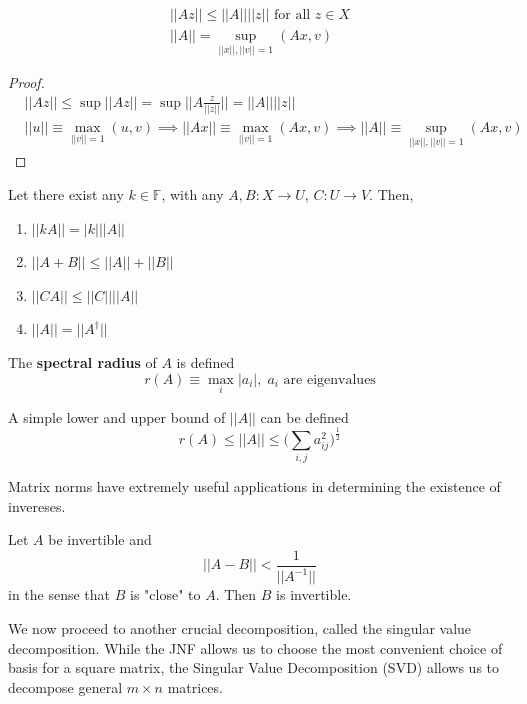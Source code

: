   \begin{theorem}
  \begin{align}
      ||A z|| \leq ||A|| ||z|| \text{ for all } z \in X \\
      ||A|| = \sup_{||x||, ||v|| = 1} (A x, v)
  \end{align}
  \end{theorem}
  \begin{proof}
  \begin{align*}
      &||A z|| \leq \sup{||A z||} = \sup{\Big|\Big| A \frac{z}{||z||} \Big|\Big|} = ||A|| ||z|| \\
      &||u|| \equiv \max_{||v||=1} (u, v) \implies ||A x|| \equiv \max_{||v||=1} (Ax, v) \implies ||A|| \equiv \sup_{||x||, ||v|| =1} (A x, v)
  \end{align*}
  \end{proof}

  \begin{theorem}
  Let there exist any $k \in \mathbb{F}$, with any $A, B: X \longrightarrow U$, $C: U \longrightarrow V$. Then, 
  \begin{enumerate}
      \item $||k A|| = |k| ||A||$
      \item $||A + B|| \leq ||A|| + ||B||$
      \item $||C A|| \leq ||C|| ||A||$
      \item $||A|| = ||A^\dagger||$
  \end{enumerate}
  \end{theorem}

  \begin{definition}
  The \textbf{spectral radius} of $A$ is defined
  \[r(A) \equiv \max_i |a_i|, \; a_i \text{ are eigenvalues}\]
  \end{definition}

  \begin{proposition}
  A simple lower and upper bound of $||A||$ can be defined
  \[ r(A) \leq ||A|| \leq \bigg( \sum_{i, j} a_{i j}^2 \bigg)^\frac{1}{2}\]
  \end{proposition}

  Matrix norms have extremely useful applications in determining the existence of invereses. 

  \begin{theorem}
  Let $A$ be invertible and 
  \[||A - B|| < \frac{1}{||A^{-1}||}\]
  in the sense that $B$ is "close" to $A$. Then $B$ is invertible. 
  \end{theorem}
  We now proceed to another crucial decomposition, called the singular value decomposition. While the JNF allows us to choose the most convenient choice of basis for a square matrix, the Singular Value Decomposition (SVD) allows us to decompose general $m \times n$ matrices. 

